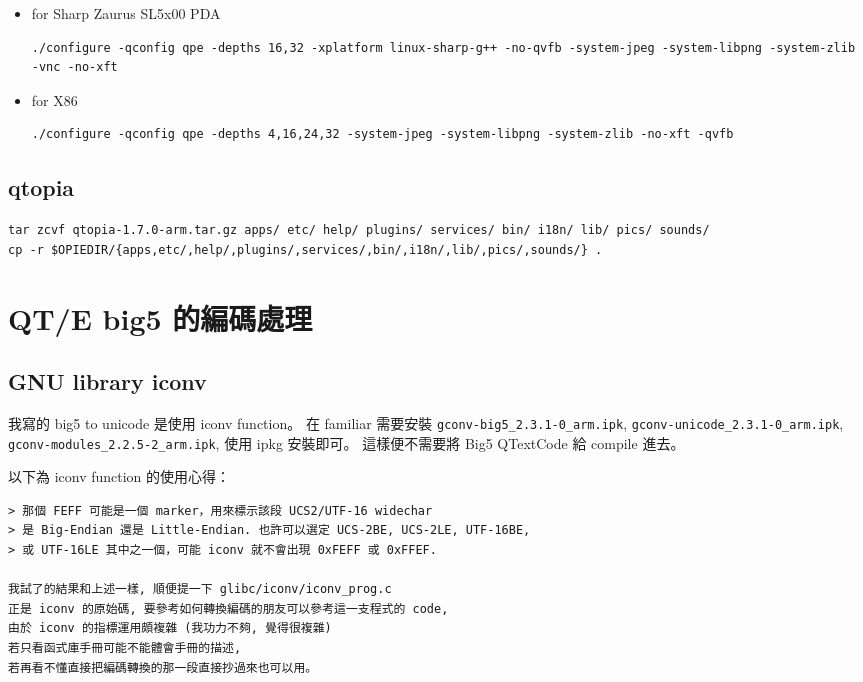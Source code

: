 \documentclass[12pt,a4paper]{article}
\begin{document}
\begin{CJK}{UTF8}{cwmu}
\begin{itemize}
\item for Sharp Zaurus SL5x00 PDA

\begin{verbatim}
./configure -qconfig qpe -depths 16,32 -xplatform linux-sharp-g++ -no-qvfb -system-jpeg -system-libpng -system-zlib -vnc -no-xft
\end{verbatim}

\item for X86
\begin{verbatim}
./configure -qconfig qpe -depths 4,16,24,32 -system-jpeg -system-libpng -system-zlib -no-xft -qvfb
\end{verbatim}

\end{itemize}

\subsection{qtopia}
\begin{verbatim}
tar zcvf qtopia-1.7.0-arm.tar.gz apps/ etc/ help/ plugins/ services/ bin/ i18n/ lib/ pics/ sounds/
cp -r $OPIEDIR/{apps,etc/,help/,plugins/,services/,bin/,i18n/,lib/,pics/,sounds/} .
\end{verbatim}

\section{QT/E big5 的編碼處理}
\subsection{GNU library iconv}
我寫的 big5 to unicode 是使用 iconv function。
在 familiar 需要安裝 \verb+gconv-big5_2.3.1-0_arm.ipk+, \verb+gconv-unicode_2.3.1-0_arm.ipk+, \verb+gconv-modules_2.2.5-2_arm.ipk+, 使用 ipkg 安裝即可。
這樣便不需要將 Big5 QTextCode 給 compile 進去。

以下為 iconv function 的使用心得：
\begin{verbatim}
> 那個 FEFF 可能是一個 marker，用來標示該段 UCS2/UTF-16 widechar 
> 是 Big-Endian 還是 Little-Endian. 也許可以選定 UCS-2BE, UCS-2LE, UTF-16BE,
> 或 UTF-16LE 其中之一個，可能 iconv 就不會出現 0xFEFF 或 0xFFEF.

我試了的結果和上述一樣, 順便提一下 glibc/iconv/iconv_prog.c
正是 iconv 的原始碼, 要參考如何轉換編碼的朋友可以參考這一支程式的 code,
由於 iconv 的指標運用頗複雜 (我功力不夠, 覺得很複雜) 
若只看函式庫手冊可能不能體會手冊的描述,
若再看不懂直接把編碼轉換的那一段直接抄過來也可以用。
\end{verbatim}


\end{CJK}
\end{document}
